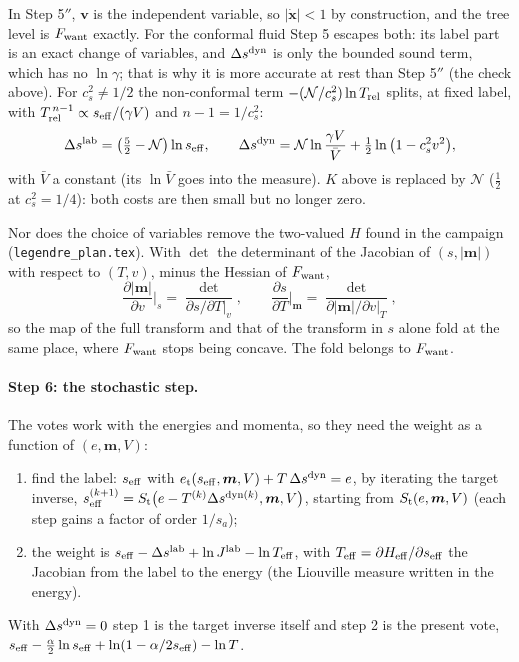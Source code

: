\documentclass[11pt,aps,preprint,nofootinbib,superscriptaddress,tightenlines]{revtex4-2}
\def\st{\begin{equation}}
\def\stp{\end{equation}}
\let\oldparagraph\paragraph
\renewcommand{\paragraph}{\par\bigskip\oldparagraph}
\begin{document}
In Step 5$''$, $\bm v$ is the independent variable, so $|\dot{\bm x}|<1$ by construction, and the tree level is $F_{\rm want}$ exactly.  For the conformal fluid
Step 5 escapes both: its label part is an exact change of variables, and $\Delta s^{\rm dyn}$ is only the bounded sound term, which has no $\ln\gamma$; that is why it
is more accurate at rest than Step 5$''$ (the check above).  For $c_s^2\neq1/2$ the non-conformal term $-(\mathcal N/c_s^2)\ln T_{\rm rel}$ splits, at fixed label, with $T_{\rm rel}^{\,n-1}\propto s_{\rm eff}/(\gamma V)$ and $n-1=1/c_s^2$:
\st
\Delta s^{\rm lab}=\big(\tfrac52-\mathcal N\big)\ln s_{\rm eff},\qquad \Delta s^{\rm dyn}=\mathcal N\ln\frac{\gamma V}{\bar V}+\tfrac12\ln\big(1-c_s^2v^2\big),
\stp
with $\bar V$ a constant (its $\ln\bar V$ goes into the measure).  $K$ above is replaced by $\mathcal N$ ($\tfrac12$ at $c_s^2=1/4$): both costs are then small but no
longer zero.

Nor does the choice of variables remove the two-valued $H$ found in the campaign (\nolinkurl{legendre_plan.tex}).  With $\det$ the determinant of the Jacobian of
$(s,|\bm m|)$ with respect to $(T,v)$, minus the Hessian of $F_{\rm want}$,
\st
\frac{\partial|\bm m|}{\partial v}\Big|_s=\frac{\det}{\partial s/\partial T|_v},\qquad
\frac{\partial s}{\partial T}\Big|_{\bm m}=\frac{\det}{\partial|\bm m|/\partial v|_T} ,
\stp
so the map of the full transform and that of the transform in $s$ alone fold at the same place, where $F_{\rm want}$ stops being concave.  The fold belongs to $F_{\rm want}$.

\paragraph{Step 6: the stochastic step.}  The votes work with the energies and momenta, so they need the weight as a function of $(e,\bm m,V)$:
\begin{enumerate}
\item find the label: $s_{\rm eff}$ with $e_{\rm t}(s_{\rm eff},\bm m,V)+T\,\Delta s^{\rm dyn}=e$, by iterating the target inverse,
  $s_{\rm eff}^{(k+1)}=S_{\rm t}\big(e-T^{(k)}\Delta s^{{\rm dyn}(k)},\bm m,V\big)$, starting from $S_{\rm t}(e,\bm m,V)$ (each step gains a factor of order $1/s_a$);
\item the weight is $s_{\rm eff}-\Delta s^{\rm lab}+\ln J^{\rm lab}-\ln T_{\rm eff}$, with $T_{\rm eff}=\partial H_{\rm eff}/\partial s_{\rm eff}$ the Jacobian from the label to the energy
  (the Liouville measure written in the energy).
\end{enumerate}
With $\Delta s^{\rm dyn}=0$ step 1 is the target inverse itself and step 2 is the present vote, $s_{\rm eff}-\tfrac\alpha2\ln s_{\rm eff}+\ln(1-\alpha/2s_{\rm eff})-\ln T$.
\end{document}
